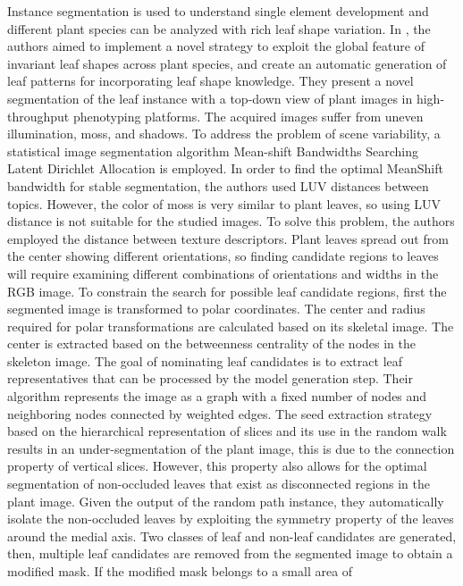 Instance segmentation is used to understand single element development and different plant species can be analyzed with rich leaf shape variation. In \cite{9411981},
the authors aimed to implement a novel strategy to exploit the global feature of invariant leaf shapes across plant species,
and create an automatic generation of leaf patterns for incorporating leaf shape knowledge.
They present a novel segmentation of the leaf instance with a top-down view of plant images in high-throughput phenotyping platforms.
The acquired images suffer from uneven illumination, moss, and shadows. To address the problem of scene variability, a statistical
image segmentation algorithm Mean-shift Bandwidths Searching Latent Dirichlet Allocation is employed. In order to find the optimal
MeanShift\cite{comaniciu2002mean} bandwidth for stable segmentation, the authors used LUV distances between topics. However, the color of moss is very similar
to plant leaves, so using LUV distance is not suitable for the studied images. To solve this problem, the authors employed the distance between
texture descriptors.
Plant leaves spread out from the center showing different orientations, so finding candidate regions to leaves will require examining different
combinations of orientations and widths in the RGB image. To constrain the search for possible leaf candidate regions, first the segmented image
is transformed to polar coordinates. The center and radius required for polar transformations are calculated based on its skeletal image. The center
is extracted based on the betweenness centrality of the nodes in the skeleton image. The goal of nominating leaf candidates is to extract leaf representatives
that can be processed by the model generation step. Their algorithm represents the image as a graph with a fixed number of nodes and neighboring nodes
connected by weighted edges. The seed extraction strategy based on the hierarchical representation of slices and its use in the random walk results in
an under-segmentation of the plant image, this is due to the connection property of vertical slices. However, this property also allows for the optimal
segmentation of non-occluded leaves that exist as disconnected regions in the plant image. Given the output of the random path instance, they automatically
isolate the non-occluded leaves by exploiting the symmetry property of the leaves around the medial axis. Two classes of leaf and non-leaf candidates are
generated, then, multiple leaf candidates are removed from the segmented image to obtain a modified mask. If the modified mask belongs to a small area of
